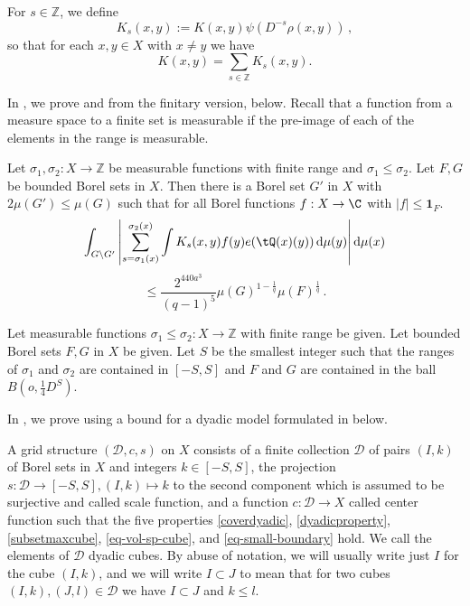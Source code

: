 For $s\in\mathbb{Z}$, we define
\begin{equation}\label{defks}
    K_s(x,y):=K(x,y)\psi(D^{-s}\rho(x,y))\,,
\end{equation}
so that for each $x, y \in X$ with $x\neq y$ we have
$$K(x,y)=\sum_{s\in\mathbb{Z}}K_s(x,y).$$

In , we prove  and 
from the finitary version,  below. Recall
that a function from a measure space to a finite set is measurable if the pre-image of each of the elements in the range is measurable.


\begin{proposition}
\label{finitary-Carleson}
\leanok
{}
Let ${\sigma_1},\sigma_2\colon X\to \mathbb{Z}$ be measurable functions with finite range and ${\sigma_1}\leq \sigma_2$.  Let $F,G$ be bounded Borel sets in $X$. Then there is a Borel set $G'$ in $X$ with $2\mu(G')\leq \mu(G)$ such that
for all Borel functions $f:X\to \C$ with $|f|\le \mathbf{1}_F$.
\begin{equation*}
    \int_{G \setminus G'} \left|\sum_{s={\sigma_1}(x)}^{{\sigma_2}(x)} \int K_s(x,y) f(y) e(\tQ(x)(y)) \, \mathrm{d}\mu(y) \right| \mathrm{d}\mu(x)
\end{equation*}
\begin{equation}
    \label{eq-linearized}
    \le \frac{2^{440a^3}}{(q-1)^5} \mu(G)^{1-\frac{1}{q}}
     \mu(F)^{\frac 1 q}\,.
\end{equation}
\end{proposition}
Let measurable functions ${\sigma_1}\leq \sigma_2\colon X\to \mathbb{Z}$ with finite range be given.
Let bounded Borel sets $F,G$ in $X$ be given.
Let $S$ be the smallest integer such that the ranges of
$\sigma_1$ and $\sigma_2$ are contained in $[-S,S]$ and $F$ and $G$ are contained
in the ball $B(o, \frac{1}{4}D^S)$.

In , we prove  using a
bound for a dyadic model formulated in  below.

A grid structure $(\mathcal{D}, c, s)$ on $X$ consists of a finite collection $\mathcal{D}$ of pairs $(I, k)$ of Borel
sets in $X$ and integers $k \in [-S, S]$, the projection $s\colon \mathcal{D}\to [-S, S], (I, k) \mapsto k$ to the second component which is assumed to be surjective and
called scale function, and a function $c:\mathcal{D}\to X$
called center function such that the five properties
\eqref{coverdyadic}, \eqref{dyadicproperty}, \eqref{subsetmaxcube},
\eqref{eq-vol-sp-cube}, and \eqref{eq-small-boundary} hold. We call the elements of $\mathcal{D}$ dyadic cubes. By abuse of notation, we will usually write just $I$ for the cube $(I,k)$, and we will write $I \subset J$ to mean that for two cubes $(I,k), (J, l) \in \mathcal{D}$ we have $I \subset J$ and $k \le l$.

